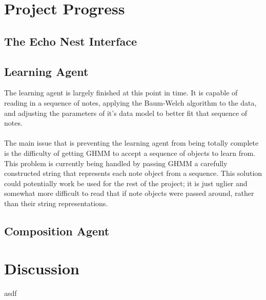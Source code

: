 \documentclass{article}
\begin{document}
\section{Project Progress}
\subsection{The Echo Nest Interface}


\subsection{Learning Agent}
The learning agent is largely finished at this point in time. It is capable of reading in a sequence
of notes, applying the Baum-Welch algorithm to the data, and adjusting the parameters of it's data
model to better fit that sequence of notes.\\
\\
The main issue that is preventing the learning agent from being totally complete is the difficulty
of getting GHMM to accept a sequence of objects to learn from. This problem is currently being
handled by passing GHMM a carefully constructed string that represents each note object from a 
sequence. This solution could potentially work be used for the rest of the project; it is just
uglier and somewhat more difficult to read that if note objects were passed around, rather than
their string representations.

\subsection{Composition Agent}


\section{Discussion}
asdf
\end{document}
